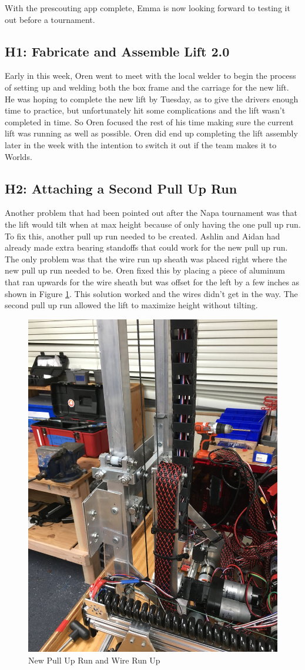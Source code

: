 \documentclass{article}
\begin{document}
With the prescouting app complete, Emma is now looking forward to testing it out before a tournament. 
\subsection{H1: Fabricate and Assemble Lift 2.0}

Early in this week, Oren went to meet with the local welder to begin the process of setting up and welding both the box frame and the carriage for the new lift. He was hoping to complete the new lift by Tuesday, as to give the drivers enough time to practice, but unfortunately hit some complications and the lift wasn't completed in time. So Oren focused the rest of his time making sure the current lift was running as well as possible. Oren did end up completing the lift assembly later in the week with the intention to switch it out if the team makes it to Worlds. 

\subsection{H2: Attaching a Second Pull Up Run}

Another problem that had been pointed out after the Napa tournament was that the lift would tilt when at max height because of only having the one pull up run. To fix this, another pull up run needed to be created. Ashlin and Aidan had already made extra bearing standoffs that could work for the new pull up run. The only problem was that the wire run up sheath was placed right where the new pull up run needed to be. Oren fixed this by placing a piece of aluminum that ran upwards for the wire sheath but was offset for the left by a few inches as shown in Figure \ref{fig:PullUp}. This solution worked and the wires didn't get in the way. The second pull up run allowed the lift to maximize height without tilting.

\begin{figure}
    \centering
    \includegraphics[width= 0.5 \textwidth]{26_02-25/images/PullUpRun2.jpg}
    \caption{New Pull Up Run and Wire Run Up}
    \label{fig:PullUp}
\end{figure}
\end{document}
